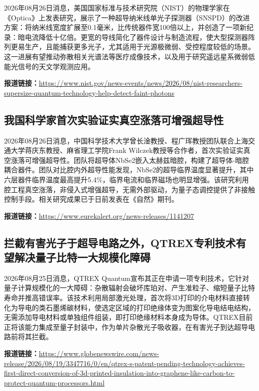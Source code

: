 \documentclass[12pt,a4paper]{ctexart}
\begin{document}
2026年08月26日消息，美国国家标准与技术研究院（NIST）的物理学家在《Optica》上发表研究，展示了一种超导纳米线单光子探测器（SNSPD）的改进方案：将纳米线宽度扩展至0.1毫米，比传统器件宽100倍以上，并创造了一项新纪录：暗电流降低十亿倍。更宽的导线简化了器件设计与制造流程，使大型探测器阵列更易生产，且能捕获更多光子，尤其适用于光源极微弱、受控程度较低的场景。这一进展有望推动弥散相关光谱法等医疗成像技术，以及用于研究遥远星系微弱低能光信号的天文学观测应用。

\noindent\textbf{报道链接：}\url{https://www.nist.gov/news-events/news/2026/08/nist-researchers-supersize-quantum-technology-help-detect-faint-photons}

\subsection{ 我国科学家首次实验证实真空涨落可增强超导性 }

2026年08月26日消息，中国科学技术大学曾长淦教授、程广珲教授团队联合上海交通大学蒋庆东教授、麻省理工学院Frank Wilczek教授等合作者，首次实验证实真空涨落可增强超导性。团队将超导体NbSe2嵌入太赫兹暗腔，构建了超导体-暗腔耦合器件。团队对比腔内外超导性能发现，NbSe2的超导临界温度显著提升，其中六层器件临界温度最高提升5.4\%，临界电流和临界磁场也明显增强。该研究利用腔工程真空涨落，非侵入式增强超导，无需外部驱动，为量子态调控提供了非接触控制手段。相关研究成果已于日前发表在《自然》期刊。

\noindent\textbf{报道链接：}\url{https://www.eurekalert.org/news-releases/1141207}

\subsection{ 拦截有害光子于超导电路之外，QTREX专利技术有望解决量子比特一大规模化障碍 }

2026年08月25日消息，QTREX Quantum宣布其正在申请一项专利技术，它针对量子计算规模化的一大障碍：杂散辐射会破坏库珀对、产生准粒子、缩短量子比特寿命并推高错误率。该技术利用局部激光处理，首次将3D打印的介电材料直接转化为导电的类石墨烯碳材料，使选定区域的打印绝缘体变为图案化导电结电结构，无需添加导电材料或单独组件组装，即打印绝缘材料本身成为导体。QTREX目前正将该能力集成至量子封装中，作为单片杂散光子吸收器，在有害光子到达超导电路前将其拦截。

\noindent\textbf{报道链接：}\url{https://www.globenewswire.com/news-release/2026/08/19/3347716/0/en/qtrex-s-patent-pending-technology-achieves-first-direct-conversion-of-3d-printed-insulation-into-graphene-like-carbon-to-protect-quantum-processors.html}
\end{document}
